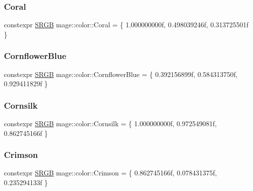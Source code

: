 \subsubsection{\texorpdfstring{Coral}{Coral}}
{\footnotesize\ttfamily constexpr \hyperlink{structmage_1_1_s_r_g_b}{S\+R\+GB} mage\+::color\+::\+Coral = \{ 1.\+000000000f, 0.\+498039246f, 0.\+313725501f \}}

\hypertarget{namespacemage_1_1color_a1591cd32f7c5dd154d48f4cb0d1627b5}{}\label{namespacemage_1_1color_a1591cd32f7c5dd154d48f4cb0d1627b5} 
\subsubsection{\texorpdfstring{Cornflower\+Blue}{CornflowerBlue}}
{\footnotesize\ttfamily constexpr \hyperlink{structmage_1_1_s_r_g_b}{S\+R\+GB} mage\+::color\+::\+Cornflower\+Blue = \{ 0.\+392156899f, 0.\+584313750f, 0.\+929411829f \}}

\hypertarget{namespacemage_1_1color_a24e0d8991b0be88d7e9bb77c4a5c0d7b}{}\label{namespacemage_1_1color_a24e0d8991b0be88d7e9bb77c4a5c0d7b} 
\subsubsection{\texorpdfstring{Cornsilk}{Cornsilk}}
{\footnotesize\ttfamily constexpr \hyperlink{structmage_1_1_s_r_g_b}{S\+R\+GB} mage\+::color\+::\+Cornsilk = \{ 1.\+000000000f, 0.\+972549081f, 0.\+862745166f \}}

\hypertarget{namespacemage_1_1color_a8114d6760627759ba375d672d57e8586}{}\label{namespacemage_1_1color_a8114d6760627759ba375d672d57e8586} 
\subsubsection{\texorpdfstring{Crimson}{Crimson}}
{\footnotesize\ttfamily constexpr \hyperlink{structmage_1_1_s_r_g_b}{S\+R\+GB} mage\+::color\+::\+Crimson = \{ 0.\+862745166f, 0.\+078431375f, 0.\+235294133f \}}

\hypertarget{namespacemage_1_1color_ab03cb555666f672d222c07e510300ffe}{}\label{namespacemage_1_1color_ab03cb555666f672d222c07e510300ffe} 
